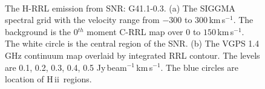 \documentclass[manuscript]{aastex61}
\newcommand{\hii}{{\rm H\,}{{\sc ii}}}
\newcommand{\kms}{\,km\,s$^{-1}$}
\begin{document}
\begin{figure}[H]
\centering
{}
\\
\caption{The H-RRL emission from SNR: G41.1-0.3.
          (a) The SIGGMA spectral grid with the velocity range from $-300$ to $300$\kms.
	  The background is the 0$^{th}$ moment C-RRL map over $0$ to $150$\kms.
	  The white circle is the central region of the SNR.
	  (b) The VGPS 1.4 GHz continuum map overlaid by integrated RRL contour.
	  The levels are 0.1, 0.2, 0.3, 0.4, 0.5 Jy\,beam$^{-1}$\kms.
	  The blue circles are location of \hii\ regions.
	  }
\label{fig_snr-g411}
\end{figure}
\end{document}
